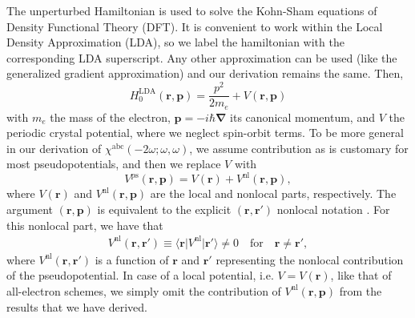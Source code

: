 The unperturbed Hamiltonian is used to solve the Kohn-Sham equations
\cite{kohnPR65} of Density Functional Theory (DFT). It is convenient to work
within the Local Density Approximation (LDA), so we label the hamiltonian with
the corresponding LDA superscript. Any other approximation can be used (like the
generalized gradient approximation) and our derivation remains the same. Then,
\begin{equation}\label{ache.2}
H^{\mathrm{LDA}}_{0}(\mathbf{r},\mathbf{p})
= \frac{p^{2}}{2m_e}+V(\mathbf{r},\mathbf{p})
\end{equation}
with $m_e$ the mass of the electron, $\mathbf{p}=-i\hbar\boldsymbol{\nabla}$ its
canonical momentum, and $V$ the periodic crystal potential, where we neglect
spin-orbit terms. To be more general in our derivation of
$\chi^{\mathrm{a}\mathrm{b}\mathrm{c}}(-2\omega;\omega,\omega)$, we assume
contribution as is customary for most pseudopotentials, and then we replace $V$
with
\begin{equation}
V^{\mathrm{ps}}(\mathbf{r},\mathbf{p})
= V(\mathbf{r})+V^{\mathrm{nl}}(\mathbf{r},\mathbf{p}),
\end{equation}
where $V(\mathbf{r})$ and $V^{\mathrm{nl}}(\mathbf{r},\mathbf{p})$ are the local
and nonlocal parts, respectively. The argument $(\mathbf{r},\mathbf{p})$ is
equivalent to the explicit $(\mathbf{r},\mathbf{r}')$ nonlocal notation
\cite{ismailPRL01}. For this nonlocal part, we have that
\begin{align}\label{ache.3n}
V^{\mathrm{nl}}(\mathbf{r},\mathbf{r}')\equiv
\langle\mathbf{r}\vert
V^{\mathrm{nl}}
\vert\mathbf{r}'\rangle \neq 0 
\quad\text{for}\quad\mathbf{r} \neq \mathbf{r}',
\end{align}
where $V^{\mathrm{nl}}(\mathbf{r},\mathbf{r}')$ is a function of $\mathbf{r}$
and $\mathbf{r}'$ representing the nonlocal contribution of the pseudopotential.
In case of a local potential, i.e. $V= V(\mathbf{r})$, like that of all-electron
schemes, we simply omit the contribution of
$V^{\mathrm{nl}}(\mathbf{r},\mathbf{p})$ from the results that we have derived.

